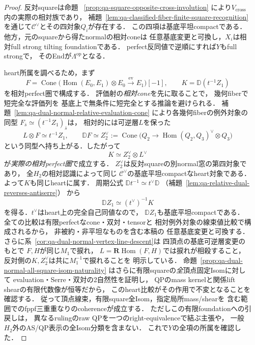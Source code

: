 \begin{proof}
反対squareは命題~
\ref{prop:qa-square-opposite-cross-involution}
により$V_{\mathrm{cross}}$内の実際の相対族であり，
補題~\ref{lem:qa-classified-fiber-finite-square-recognition}
を通じて$\mathcal C^\vee$とその四対象$Q_i$が存在する．
この四項は基底平坦compactである．
他方，元のsquareから得たnormalの相対coneは
任意基底変更と可換し，$X_i$は相対full strong
tilting foundationである．
perfect反同値で逆順にすれば$Y$もfull strongで，
そのEndが$\Lambda^{\mathrm{op}}$となる．

heart所属を調べるため，まず
\[
 F=\operatorname{Cone}
  \bigl(\operatorname{Hom}(E_0,E_1)\otimes E_0
       \xrightarrow{\mathrm{ev}}E_1\bigr)[-1],
 \qquad K=\mathbb D(t^{-1}Z_1)
\]
を相対perfect圏で構成する．
評価射の\emph{相対cone}を先に取ることで，
幾何fiberで短完全な評価列を
基底上で無条件に短完全とする推論を避けられる．
補題~\ref{lem:qa-dual-normal-relative-evaluation-cone}
により各幾何fiberの例外対象の同型
$F_{\bar s}\simeq(t^{-1}Z_1)_{\bar s}$は，
相対的には可逆層$L$を保った
\[
 L\otimes F\simeq t^{-1}Z_1,\qquad
 \mathbb DF\simeq
 Z_2^\vee:=
 \operatorname{Cone}\bigl(
 Q_2\to\operatorname{Hom}(Q_2,Q_3)^\vee\otimes Q_3
 \bigr)
\]
という同型へ持ち上がる．したがって
\[
 K\simeq Z_2^\vee\otimes L^\vee
\]
が\emph{実際の相対perfect圏}で成立する．
$Z_2^\vee$は反対squareの別normal窓の第四対象であり，
全$H_2$の相対認識によって同じ
$\mathcal C^\vee$の基底平坦compactなheart対象である．
よって$K$も同じheartに属す．
周期公式
$\mathbb Dt^{-1}\simeq t^\vee\mathbb D$
（補題~\ref{lem:qa-relative-dual-reverses-antiserre}）
から
\[
 \mathbb DZ_1\simeq(t^\vee)^{-1}K
\]
を得る．$t^\vee$はheart上の完全自己同値なので，
$\mathbb DZ_1$も基底平坦compactである．
全ての比較は有限perfectなcone・双対・tensorと
相対例外対象の線束値比較で構成されるから，
非被約・非平坦なものを含む本稿の
任意基底変更と可換する．
さらに系~\ref{cor:qa-dual-normal-vertex-line-descent}は
四頂点の基底可逆層変更のもとで
$F,H$が同じ$M_1$で捩れ，
$L=\mathbf R\operatorname{Hom}(F,H)$では捩れが相殺すること，
反対側の$K,Z_2^\vee$は共に$M_1^{-1}$で捩れることを
明示している．
命題~\ref{prop:qa-dual-normal-all-square-isom-naturality}
はさらに有限squareの\emph{全}頂点固定Isomに対して
evaluation・Serre・双対の2自然性を証明し，
QPのmass kernelと関係lift shearの有限代数像が恒等だから，
このheart比較がその作用で不変となることを確認する．
従って頂点線束，有限square全Isom，指定局所mass/shearを
含む範囲でのfppf三重重なりのcoherenceが成立する．
ただしこの有限foundationへの引戻しは，
異なるrulingのraw QPを一つのright-equivalenceで結ぶ主張や，
一般$H_2$外のAS/QP表示の全Isom分類を含まない．
これで$Y$の全項の所属を確認した．


\end{proof}
